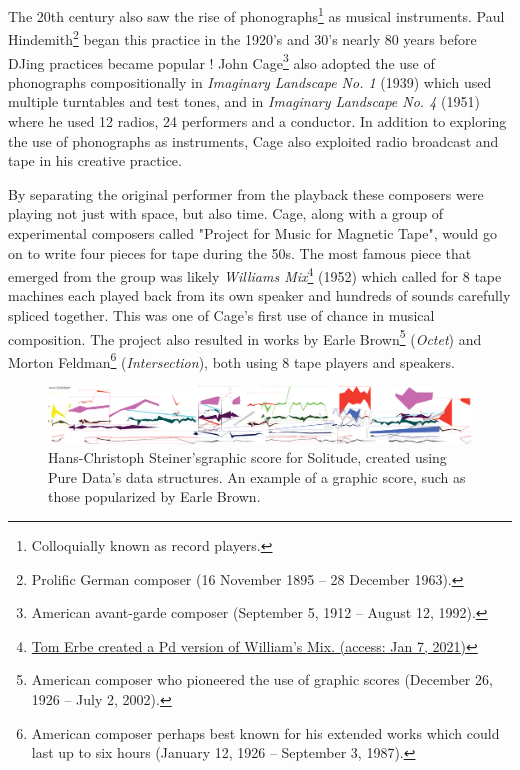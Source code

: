 
The 20th century also saw the rise of phonographs\footnote{Colloquially known as record players.} as musical instruments. Paul Hindemith\footnote{Prolific German composer (16 November 1895 – 28 December 1963).} began this practice in the 1920's and 30's nearly 80 years before DJing practices became popular \cite{manning2013electronic}! John Cage\footnote{American avant-garde composer (September 5, 1912 – August 12, 1992).} also adopted the use of phonographs compositionally in \textit{Imaginary Landscape No. 1} (1939) which used multiple turntables and test tones, and in \textit{Imaginary Landscape No. 4} (1951) where he used 12 radios, 24 performers and a conductor. In addition to exploring the use of phonographs as instruments, Cage also exploited radio broadcast and tape in his creative practice.  

By separating the original performer from the playback these composers were playing not just with space, but also time. Cage, along with a group of experimental composers called "Project for Music for Magnetic Tape", would go on to write four pieces for tape \cite{cage1961experimental} during the 50s. The most famous piece that emerged from the group was likely \textit{Williams Mix}\footnote{\href{http://tre.ucsd.edu/wordpress/?p=644}{Tom Erbe created a Pd version of William's Mix. (access: Jan 7, 2021)} } (1952) which called for 8 tape machines each played back from its own speaker and hundreds of sounds carefully spliced together. This was one of Cage's first use of chance in musical composition. The project also resulted in works by Earle Brown\footnote{American composer who pioneered the use of graphic scores (December 26, 1926 – July 2, 2002).} (\textit{Octet}) and Morton Feldman\footnote{American composer perhaps best known for his extended works which could last up to six hours (January 12, 1926 – September 3, 1987).} (\textit{Intersection}), both using 8 tape players and speakers. 

\begin{figure}[ht!]%
\centering
\includegraphics[width=1.0\textwidth]{img/solitude.png} 
\caption{Hans-Christoph Steiner's\protect\footnotemark graphic score for Solitude, created using Pure Data's data structures. An example of a graphic score, such as those popularized by Earle Brown. \cite{wikipedia_2020_graphic}}
\end{figure}

